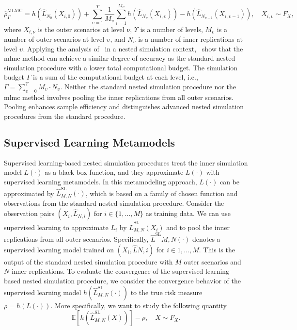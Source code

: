 \begin{equation*}
    \hat{\rho}^{\text{MLMC}}_\Gamma = h(\hat{L}_{N_{0}}(X_{i, 0})) + \sum_{\upsilon=1}^{\Upsilon}  \frac{1}{M_{\upsilon}} \sum_{i=1}^{M_{\upsilon}} h(\hat{L}_{N_{\upsilon}}(X_{i, \upsilon})) -  h(\hat{L}_{N_{\upsilon-1}}(X_{i, \upsilon-1}))  , \quad X_{i, \upsilon} \sim F_X,
\end{equation*}
where $X_{i, \nu}$ is the outer scenarios at level $\nu$, $\Upsilon$ is a number of levels, $M_{\upsilon}$ is a number of outer scenarios at level $\upsilon$, and $N_{\upsilon}$ is a number of inner replications at level $\upsilon$.
Applying the analysis of~\cite{giles2015multilevel} in a nested simulation context,~\cite{giles2019multilevel} show that the \gls{mlmc} method can achieve a similar degree of accuracy as the standard nested simulation procedure with a lower total computational budget.
The simulation budget $\Gamma$ is a sum of the computational budget at each level, i.e., $\Gamma = \sum_{\upsilon=0}^{\Upsilon} M_{\upsilon} \cdot N_{\upsilon}$.
Neither the standard nested simulation procedure nor the \gls{mlmc} method involves pooling the inner replications from all outer scenarios.
Pooling enhances sample efficiency and distinguishes advanced nested simulation procedures from the standard procedure.

\subsection{Supervised Learning Metamodels}

Supervised learning-based nested simulation procedures treat the inner simulation model $L(\cdot)$ as a black-box function, and they approximate $L(\cdot)$ with supervised learning metamodels.
In this metamodeling approach, $L(\cdot)$ can be approximated by $\hat{L}^{\text{SL}}_{M, N}(\cdot)$, which is based on a family of chosen function and observations from the standard nested simulation procedure.
Consider the observation pairs $(X_i, \hat{L}_{N, i})$ for $i \in \{1, \dots, M\}$ as training data.
We can use supervised learning to approximate $L_i$ by $\hat{L}_{M, N}^{\text{SL}}(X_i)$ and to pool the inner replications from all outer scenarios.
Specifically, $\hat{L}^{\text{SL}}{M, N}(\cdot)$ denotes a supervised learning model trained on $(X_i, \hat{L}{N, i})$ for $i \in {1, \dots, M}$.
This is the output of the standard nested simulation procedure with $M$ outer scenarios and $N$ inner replications.
To evaluate the convergence of the supervised learning-based nested simulation procedure, we consider the convergence behavior of the supervised learning model $h(\hat{L}^{\text{SL}}_{M, N}(\cdot))$ to the true risk measure $\rho = h(L(\cdot))$.
More specifically, we want to study the following quantity
\begin{equation}\label{eq1:sl-E}
    \mathbb{E} \left[ h(\hat{L}^{\text{SL}}_{M, N}(X))   \right] - \rho, \quad X \sim F_X.
\end{equation}

